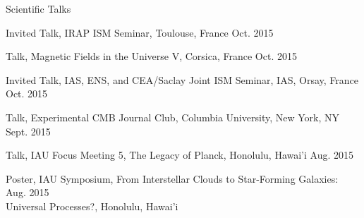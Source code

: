 \documentclass{resume_clark} %
\newcommand{\hi}{H{\sc i}~}
\begin{document}
\begin{rSection}{Scientific Talks}
\begin{etaremune}
\item Invited Talk, IRAP ISM Seminar, Toulouse, France \hfill{Oct. 2015}

\item Talk, Magnetic Fields in the Universe V, Corsica, France \hfill {Oct. 2015}

\item Invited Talk, IAS, ENS, and CEA/Saclay Joint ISM Seminar, IAS, Orsay, France \hfill {Oct. 2015}

\item Talk, Experimental CMB Journal Club, Columbia University, New York, NY \hfill {Sept. 2015}

\item Talk, IAU Focus Meeting 5, The Legacy of Planck, Honolulu, Hawai'i \hfill {Aug. 2015}

\item Poster, IAU Symposium, From Interstellar Clouds to Star-Forming Galaxies: \hfill {Aug. 2015}\\Universal Processes?, Honolulu, Hawai'i


\end{etaremune}
\end{rSection}
\end{document}
